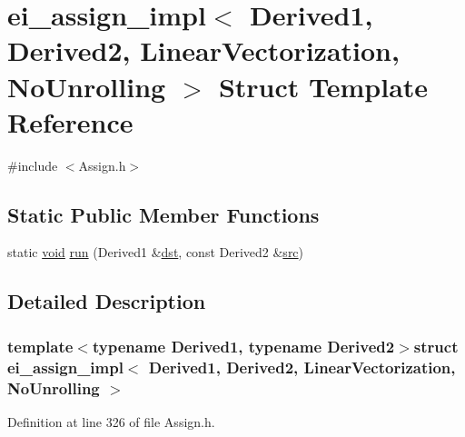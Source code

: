 \hypertarget{structei__assign__impl_3_01_derived1_00_01_derived2_00_01_linear_vectorization_00_01_no_unrolling_01_4}{\section{ei\-\_\-assign\-\_\-impl$<$ Derived1, Derived2, Linear\-Vectorization, No\-Unrolling $>$ Struct Template Reference}
\label{structei__assign__impl_3_01_derived1_00_01_derived2_00_01_linear_vectorization_00_01_no_unrolling_01_4}
}


{\ttfamily \#include $<$Assign.\-h$>$}

\subsection*{Static Public Member Functions}
\begin{DoxyCompactItemize}
\item 
static \hyperlink{group___u_a_v_objects_plugin_ga444cf2ff3f0ecbe028adce838d373f5c}{void} \hyperlink{structei__assign__impl_3_01_derived1_00_01_derived2_00_01_linear_vectorization_00_01_no_unrolling_01_4_a1789f34b4e432f513c049393c6ab9b54}{run} (Derived1 \&\hyperlink{glext_8h_a92034251bfd455d524a9b5610cddba00}{dst}, const Derived2 \&\hyperlink{glext_8h_a72e0fdf0f845ded60b1fada9e9195cd7}{src})
\end{DoxyCompactItemize}


\subsection{Detailed Description}
\subsubsection*{template$<$typename Derived1, typename Derived2$>$struct ei\-\_\-assign\-\_\-impl$<$ Derived1, Derived2, Linear\-Vectorization, No\-Unrolling $>$}



Definition at line 326 of file Assign.\-h.



